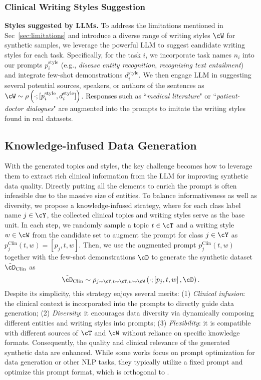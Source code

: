 \subsubsection{Clinical Writing Styles Suggestion}
\textbf{Styles suggested by LLMs.} To address the limitations mentioned in Sec~\ref{sec:limitations} and introduce a diverse range of writing styles $\cW$ for synthetic samples, we leverage the powerful LLM to suggest candidate writing styles for each task. Specifically, for the task $i$, we incorporate task names $n_i$ into our prompts $p^{\operatorname{style}}_{i}$ (e.g., \emph{disease entity recognition}, \emph{recognizing text entailment}) and integrate few-shot demonstrations $d^{\operatorname{style}}_{i}$. We then engage LLM in suggesting several potential sources, speakers, or authors of the sentences as $\cW \sim \rho\left(\cdot; [p^{\operatorname{style}}_{i}, d^{\operatorname{style}}_{i}]\right)$. 
Responses such as ``\emph{medical literature}" or ``\emph{patient-doctor dialogues}" are augmented into the prompts to imitate the writing styles found in real datasets. 

\subsection{Knowledge-infused Data Generation}
With the generated topics and styles, the key challenge becomes how to leverage them to extract rich clinical information from the LLM for improving synthetic data quality.
Directly putting all the elements to enrich the prompt is often infeasible due to the massive size of entities.
To balance informativeness as well as diversity, we propose a knowledge-infused strategy, where for each class label name $j\in\cY$, the collected clinical topics and writing styles serve as the base unit. 
In each step, we randomly sample a topic $t \in \cT$ and a writing style $w \in \cW$ from the candidate set to augment the prompt for class $j \in \cY$  as 
$p^{\operatorname{Clin}}_j(t, w) = [p_j, t, w]$. 
Then, we use the augmented prompt $p^{\operatorname{Clin}}_j(t, w)$ together with the few-shot demonstrations $\cD$ to generate the synthetic dataset $\tilde{\cD}_{\operatorname{Clin}}$ as 
\begin{equation}
\setlength{\abovedisplayskip}{6pt}
\setlength{\belowdisplayskip}{6pt}
\tilde{\cD}_{\operatorname{Clin}} \sim \rho_{j\sim\cY, t\sim \cT, w\sim\cW}\left(\cdot; \left[p_j, t, w\right], \cD\right).
\nonumber
\end{equation}
Despite its simplicity, this strategy enjoys several merits: 
(1) \emph{Clinical infusion}: the clinical context is incorporated into the prompts to directly guide data generation; 
(2) \emph{Diversity}: it encourages data  diversity via dynamically composing different entities and writing styles into prompts; 
(3) \emph{Flexibility}: it is compatible with different sources of $\cT$ and $\cW$ without reliance on specific knowledge formats. 
Consequently, the quality and clinical relevance of the generated synthetic data are enhanced.  
While some works focus on prompt optimization for data generation or other NLP tasks, they typically utilize a fixed prompt and optimize this prompt format, which is orthogonal to \ours{}.


